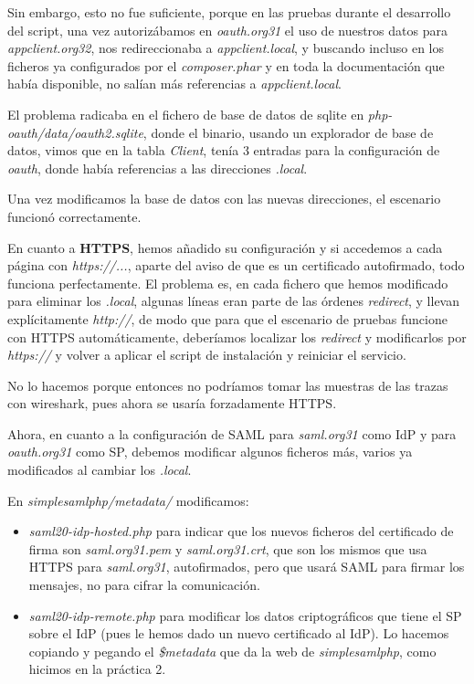 \documentclass[]{article}
\begin{document}
\hfill

Sin embargo, esto no fue suficiente, porque en las pruebas durante el desarrollo del script, una vez autorizábamos en \textit{oauth.org31} el uso de nuestros datos para \textit{appclient.org32}, nos redireccionaba a \textit{appclient.local}, y buscando incluso en los ficheros ya configurados por el \textit{composer.phar} y en toda la documentación que había disponible, no salían más referencias a \textit{appclient.local}.

El problema radicaba en el fichero de base de datos de sqlite en \textit{php-oauth/data/oauth2.sqlite}, donde el binario, usando un explorador de base de datos, vimos que en la tabla \textit{Client}, tenía 3 entradas para la configuración de \textit{oauth}, donde había referencias a las direcciones \textit{.local}. 

Una vez modificamos la base de datos con las nuevas direcciones, el escenario funcionó correctamente.

\hfill

En cuanto a \textbf{HTTPS}, hemos añadido su configuración y si accedemos a cada página con \textit{https://...}, aparte del aviso de que es un certificado autofirmado, todo funciona perfectamente. El problema es, en cada fichero que hemos modificado para eliminar los \textit{.local}, algunas líneas eran parte de las órdenes \textit{redirect}, y llevan explícitamente \textit{http://}, de modo que para que el escenario de pruebas funcione con HTTPS automáticamente, deberíamos localizar los \textit{redirect} y modificarlos por \textit{https://} y volver a aplicar el script de instalación y reiniciar el servicio.

No lo hacemos porque entonces no podríamos tomar las muestras de las trazas con wireshark, pues ahora se usaría forzadamente HTTPS.


\hfill

Ahora, en cuanto a la configuración de SAML para \textit{saml.org31} como IdP y para \textit{oauth.org31} como SP, debemos modificar algunos ficheros más, varios ya modificados al cambiar los \textit{.local}.

En \textit{simplesamlphp/metadata/} modificamos:
\begin{itemize}
	\item
	\textit{saml20-idp-hosted.php} para indicar que los nuevos ficheros del certificado de firma son \textit{saml.org31.pem} y \textit{saml.org31.crt}, que son los mismos que usa HTTPS para \textit{saml.org31}, autofirmados, pero que usará SAML para firmar los mensajes, no para cifrar la comunicación.
	
	\item
	\textit{saml20-idp-remote.php} para modificar los datos criptográficos que tiene el SP sobre el IdP (pues le hemos dado un nuevo certificado al IdP). Lo hacemos copiando y pegando el \textit{\$metadata} que da la web de \textit{simplesamlphp}, como hicimos en la práctica 2.
\end{itemize}
\end{document}
